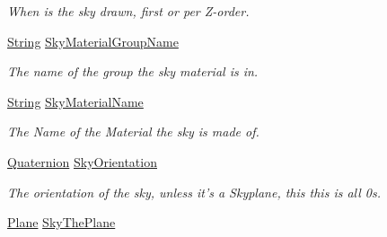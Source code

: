 \begin{DoxyCompactItemize}
\begin{DoxyCompactList}\small\item\em When is the sky drawn, first or per Z-\/order. \item\end{DoxyCompactList}\item 
\hypertarget{classMezzanine_1_1internal_1_1SceneManagerData_ad260c004ca947535c9335670ce648c40}{
\hyperlink{namespaceMezzanine_acf9fcc130e6ebf08e3d8491aebcf1c86}{String} \hyperlink{classMezzanine_1_1internal_1_1SceneManagerData_ad260c004ca947535c9335670ce648c40}{SkyMaterialGroupName}}
\label{classMezzanine_1_1internal_1_1SceneManagerData_ad260c004ca947535c9335670ce648c40}

\begin{DoxyCompactList}\small\item\em The name of the group the sky material is in. \item\end{DoxyCompactList}\item 
\hypertarget{classMezzanine_1_1internal_1_1SceneManagerData_a135f8d314a1f9d65da8abb8fe6a077f0}{
\hyperlink{namespaceMezzanine_acf9fcc130e6ebf08e3d8491aebcf1c86}{String} \hyperlink{classMezzanine_1_1internal_1_1SceneManagerData_a135f8d314a1f9d65da8abb8fe6a077f0}{SkyMaterialName}}
\label{classMezzanine_1_1internal_1_1SceneManagerData_a135f8d314a1f9d65da8abb8fe6a077f0}

\begin{DoxyCompactList}\small\item\em The Name of the Material the sky is made of. \item\end{DoxyCompactList}\item 
\hypertarget{classMezzanine_1_1internal_1_1SceneManagerData_a9d39967fa06e4d3ce19c2af6dfff683f}{
\hyperlink{classMezzanine_1_1Quaternion}{Quaternion} \hyperlink{classMezzanine_1_1internal_1_1SceneManagerData_a9d39967fa06e4d3ce19c2af6dfff683f}{SkyOrientation}}
\label{classMezzanine_1_1internal_1_1SceneManagerData_a9d39967fa06e4d3ce19c2af6dfff683f}

\begin{DoxyCompactList}\small\item\em The orientation of the sky, unless it's a Skyplane, this this is all 0s. \item\end{DoxyCompactList}\item 
\hypertarget{classMezzanine_1_1internal_1_1SceneManagerData_af10de15bea765a63419ec1c90e7f0442}{
\hyperlink{classMezzanine_1_1Plane}{Plane} \hyperlink{classMezzanine_1_1internal_1_1SceneManagerData_af10de15bea765a63419ec1c90e7f0442}{SkyThePlane}}
\label{classMezzanine_1_1internal_1_1SceneManagerData_af10de15bea765a63419ec1c90e7f0442}


\end{DoxyCompactItemize}

